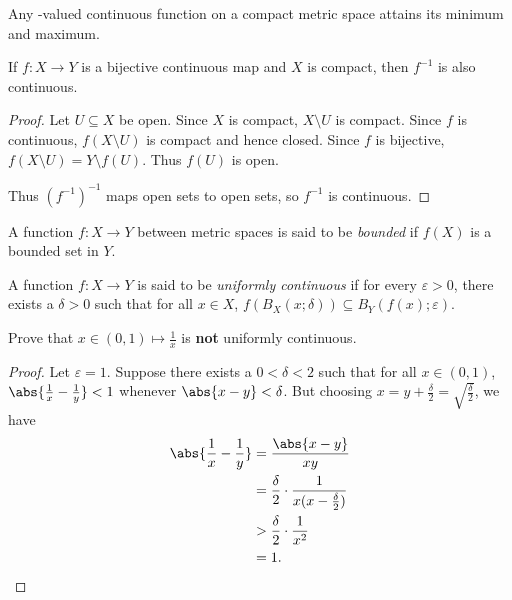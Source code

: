 \begin{corollary}
    Any \R-valued continuous function on a compact metric space
    attains its minimum and maximum.
\end{corollary}
\begin{corollary}
    If $f\colon X \to Y$ is a bijective continuous map and $X$ is compact,
    then $f^{-1}$ is also continuous.
\end{corollary}
\begin{proof}
    Let $U \subseteq X$ be open.
    Since $X$ is compact, $X \setminus U$ is compact.
    Since $f$ is continuous, $f(X \setminus U)$ is compact and hence
    closed.
    Since $f$ is bijective, $f(X \setminus U) = Y \setminus f(U)$.
    Thus $f(U)$ is open.

    Thus $(f^{-1})^{-1}$ maps open sets to open sets,
    so $f^{-1}$ is continuous.
\end{proof}
\begin{definition}[Bounded] \label{def:cont:bounded}
    A function $f\colon X \to Y$ between metric spaces is said to be
    \emph{bounded} if $f(X)$ is a bounded set in $Y$.
\end{definition}
\begin{definition} \label{def:cont:uniform}
    A function $f\colon X \to Y$ is said to be \emph{uniformly continuous}
    if for every $\varepsilon > 0$, there exists a $\delta > 0$ such that
    for all $x \in X$, $f(B_X(x; \delta)) \subseteq B_Y(f(x); \varepsilon)$.
\end{definition}

\begin{exercise}
    Prove that $x \in (0, 1) \mapsto \frac1x$ is \textbf{not}
    uniformly continuous.
\end{exercise}
\begin{proof}
    Let $\varepsilon = 1$.
    Suppose there exists a $0 < \delta < 2$ such that for all
    $x \in (0, 1)$,
    $\abs{\frac1x - \frac1y} < 1$ whenever $\abs{x - y} < \delta$.
    But choosing $x = y + \frac{\delta}{2} = \sqrt{\frac{\delta}{2}}$,
    we have \begin{align*}
        \abs{\frac1x - \frac1y} &= \frac{\abs{x - y}}{xy} \\
        &= \frac{\delta}{2} \cdot \frac1{x(x-\frac{\delta}{2})} \\
        &> \frac{\delta}{2} \cdot \frac1{x^2} \\
        &= 1. \qedhere
    \end{align*}
\end{proof}
